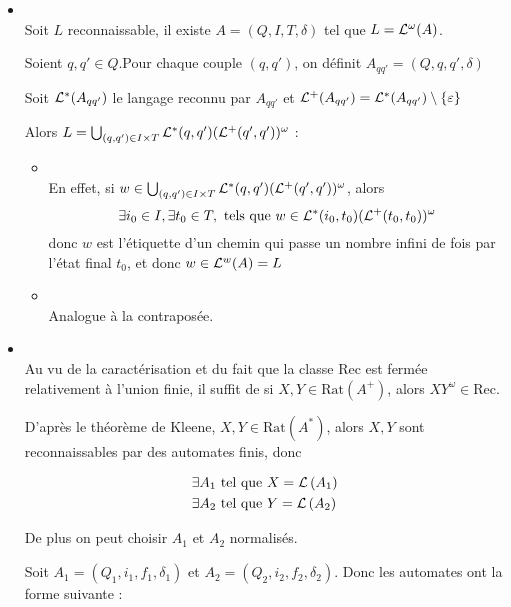 \begin{proofI}
	\begin{itemize}
		\item \bimpRL \\
		      Soit $L$ reconnaissable, il existe $A = (Q,I,T,\delta)$ tel que $L = \mathcal{L}^{\omega}(A)$.

		      Soient $q,q' \in Q$.Pour chaque couple $(q,q')$, on définit $A_{qq'} = (Q,q,q',\delta)$

		      Soit $\mathcal{L}^*(A_{qq'})$ le langage reconnu par $A_{qq'}$ et $\mathcal{L}^+(A_{qq'}) = \mathcal{L}^*(A_{qq'}) \setminus \left\{\varepsilon\right\}$

		      Alors $L = \bigcup_{(q,q') \in I \times T} \mathcal{L}^*(q,q')(\mathcal{L}^+(q',q'))^{\omega}$ :

		      \begin{itemize}
			      \item \fbox{$\supseteq$} \\
			            En effet, si $w \in \bigcup_{(q,q') \in I \times T} \mathcal{L}^*(q,q')(\mathcal{L}^+(q',q'))^{\omega}$, alors
			            $$\exists i_0 \in I, \exists t_0 \in T, \text{ tels que } w \in \mathcal{L}^*(i_0,t_0)(\mathcal{L}^+(t_0,t_0))^{\omega}$$
			            donc $w$ est l'étiquette d'un chemin qui passe un nombre infini de fois par l'état final $t_0$, et donc
			            $w\in \mathcal{L}^w (A) = L$
			      \item \fbox{$\subseteq$} \\
			            Analogue à la contraposée.
		      \end{itemize}

		\item \bimpLR \\
		      Au vu de la caractérisation et du fait que la classe Rec est fermée relativement à l'union finie, il suffit de \mq si
		      $X,Y \in \text{Rat}(A^+)$, alors $XY^{\omega} \in \text{Rec}$.

		      D'après le théorème de Kleene, $X,Y \in \text{Rat} (A^*)$, alors $X,Y$ sont reconnaissables par des automates finis, donc

		      \begin{eqnarray*}
			      &\exists A_1 \text{ tel que } X = \mathcal{L}\left(A_1\right) \\
			      &\exists A_2 \text{ tel que } Y = \mathcal{L}\left(A_2\right)
		      \end{eqnarray*}

		      De plus on peut choisir $A_1$ et $A_2$ normalisés.

		      Soit $A_1 = (Q_1, i_1, f_1, \delta_1)$ et $A_2 = (Q_2, i_2, f_2, \delta_2)$.
		      Donc les automates ont la forme suivante :


\end{itemize}
\end{proofI}
